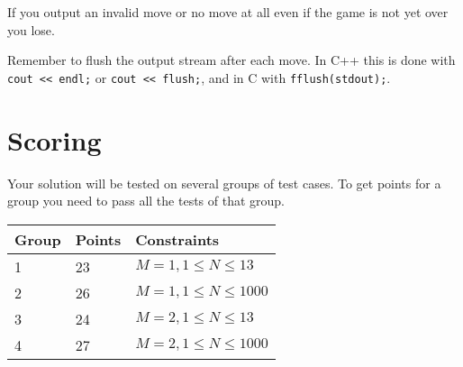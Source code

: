 If you output an invalid move or no move at all even if the game is not yet over you lose.

Remember to flush the output stream after each move.
In C++ this is done with \texttt{cout << endl;} or \texttt{cout << flush;}, and in C with \texttt{fflush(stdout);}.

\section*{Scoring}
Your solution will be tested on several groups of test cases. To get points for a group you need to pass all the tests of that group.

\noindent
\begin{tabular}{| l | l | l |}
	\hline
	Group & Points & Constraints\\ \hline
1     & 23         & $ M=1, 1 \le N \le 13 $ \\ \hline
2     & 26         & $ M=1, 1 \le N \le 1000 $ \\ \hline
3     & 24         & $ M=2, 1 \le N \le 13 $ \\ \hline
4     & 27         & $ M=2, 1 \le N \le 1000 $ \\ \hline
\end{tabular}


